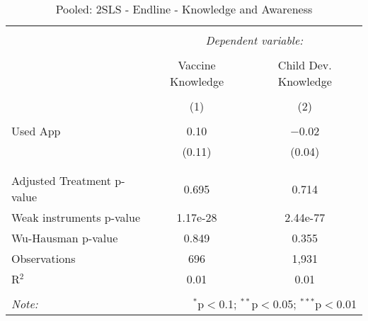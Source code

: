 
\begin{table}[!htbp] \centering 
  \caption{Pooled: 2SLS - Endline - Knowledge and Awareness} 
  \label{tbl:Pooled: 2SLS - Endline - Knowledge and Awareness} 
\begin{tabular}{@{\extracolsep{5pt}}lcc} 
\\[-1.8ex]\hline 
\hline \\[-1.8ex] 
 & \multicolumn{2}{c}{\textit{Dependent variable:}} \\ 
\cline{2-3} 
\\[-1.8ex] & Vaccine Knowledge & Child Dev. Knowledge \\ 
\\[-1.8ex] & (1) & (2)\\ 
\hline \\[-1.8ex] 
 Used App & 0.10 & $-$0.02 \\ 
  & (0.11) & (0.04) \\ 
  & & \\ 
\hline \\[-1.8ex] 
Adjusted Treatment p-value & 0.695 & 0.714 \\ 
Weak instruments p-value & 1.17e-28 & 2.44e-77 \\ 
Wu-Hausman p-value & 0.849 & 0.355 \\ 
Observations & 696 & 1,931 \\ 
R$^{2}$ & 0.01 & 0.01 \\ 
\hline 
\hline \\[-1.8ex] 
\textit{Note:}  & \multicolumn{2}{r}{$^{*}$p$<$0.1; $^{**}$p$<$0.05; $^{***}$p$<$0.01} \\ 
\end{tabular} 
\end{table} 
